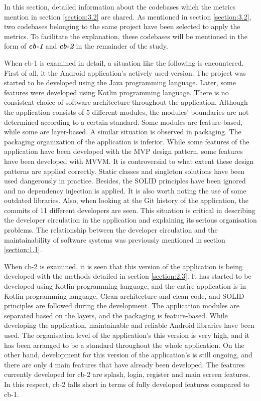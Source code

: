 In this section, detailed information about the codebases which the metrics mention in section \ref{section:3.2} are shared. As mentioned in section \ref{section:3.2}, two codebases belonging to the same project have been selected to apply the metrics. To facilitate the explanation, these codebases will be mentioned in the form of \textbf{\textit{cb-1}} and \textbf{\textit{cb-2}} in the remainder of the study.

When cb-1 is examined in detail, a situation like the following is encountered. First of all, it the Android application's actively used version. The project was started to be developed using the Java programming language. Later, some features were developed using Kotlin programming language. There is no consistent choice of software architecture throughout the application. Although the application consists of 5 different modules, the modules' boundaries are not determined according to a certain standard. Some modules are feature-based, while some are layer-based. A similar situation is observed in packaging. The packaging organization of the application is inferior. While some features of the application have been developed with the MVP design pattern, some features have been developed with MVVM. It is controversial to what extent these design patterns are applied correctly. Static classes and singleton solutions have been used dangerously in practice. Besides, the SOLID principles have been ignored and no dependency injection is applied. It is also worth noting the use of some outdated libraries. Also, when looking at the Git history of the application, the commits of 11 different developers are seen. This situation is critical in describing the developer circulation in the application and explaining its serious organisation problems. The relationship between the developer circulation and the maintainability of software systems was previously mentioned in section \ref{section:1.1}.

When cb-2 is examined, it is seen that this version of the application is being developed with the methods detailed in section \ref{section:2.3}. It has started to be developed using Kotlin programming language, and the entire application is in Kotlin programming language.  Clean architecture and clean code, and SOLID principles are followed during the development. The application modules are separated based on the layers, and the packaging is feature-based. While developing the application, maintainable and reliable Android libraries have been used. The organisation level of the application's this version is very high, and it has been arranged to be a standard throughout the whole application. On the other hand,  development for this version of the application's is still ongoing, and there are only 4 main features that have already been developed. The features currently developed for cb-2 are splash, login, register and main screen features. In this respect, cb-2 falls short in terms of fully developed features compared to cb-1.

